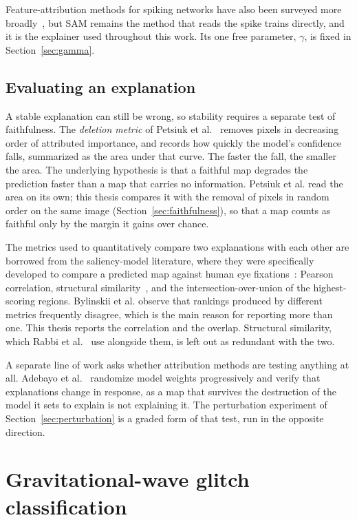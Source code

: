 Feature-attribution methods for spiking networks have also been surveyed more
broadly~\cite{nguyen2023attribution}, but SAM remains the method that reads the
spike trains directly, and it is the explainer used throughout this work. Its
one free parameter, $\gamma$, is fixed in Section~\ref{sec:gamma}.

\subsection{Evaluating an explanation}

A stable explanation can still be wrong, so stability requires a separate test
of faithfulness. The \emph{deletion metric} of Petsiuk et
al.~\cite{petsiuk2018rise} removes pixels in decreasing order of attributed
importance, and records how quickly the model's confidence falls, summarized as
the area under that curve. The faster the fall, the smaller the area. The
underlying hypothesis is that a faithful map degrades the prediction faster than
a map that carries no information. Petsiuk et al. read the area on its own; this
thesis compares it with the removal of pixels in random order on the same image
(Section~\ref{sec:faithfulness}), so that a map counts as faithful only by the
margin it gains over chance.

The metrics used to quantitatively compare two explanations with each other are borrowed from
the saliency-model literature, where they were specifically developed to compare a predicted
map against human eye fixations~\cite{bylinskii2019metrics}: Pearson
correlation, structural similarity~\cite{wang2004ssim}, and the
intersection-over-union of the highest-scoring regions. Bylinskii et al. observe
that rankings produced by different metrics frequently disagree, which is the
main reason for reporting more than one. This thesis reports the correlation and
the overlap. Structural similarity, which Rabbi et al.~\cite{rabbi2026} use
alongside them, is left out as redundant with the two.

A separate line of work asks whether attribution methods are testing anything at
all. Adebayo et al.~\cite{adebayo2018sanity} randomize model weights
progressively and verify that explanations change in response, as a map that
survives the destruction of the model it sets to explain is not explaining
it. The perturbation experiment of Section~\ref{sec:perturbation} is a graded
form of that test, run in the opposite direction.

\section{Gravitational-wave glitch classification}
\label{sec:gravityspy}

